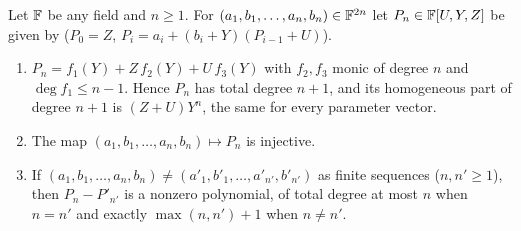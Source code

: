 \begin{lemma}\label{lem:ph:injective}
Let $\mathbb{F}$ be any field and $n\ge1$.  For $(a_1,b_1,\dots,a_n,b_n)\in\mathbb{F}^{2n}$ let
$P_n\in\mathbb{F}[U,Y,Z]$ be given by 
($P_0=Z$, $P_i=a_i+(b_i+Y)(P_{i-1}+U)$).
\begin{enumerate}[label=(\roman*)]
\item $P_n=f_1(Y)+Z\,f_2(Y)+U\,f_3(Y)$ with $f_2,f_3$ monic of degree $n$ and
      $\deg f_1\le n-1$.  Hence $P_n$ has total degree $n+1$, and its
      homogeneous part of degree $n+1$ is $(Z+U)Y^n$, the same for every
      parameter vector.
\item The map $(a_1,b_1,\dots,a_n,b_n)\mapsto P_n$ is injective.
\item If $(a_1,b_1,\dots,a_n,b_n)\ne(a'_1,b'_1,\dots,a'_{n'},b'_{n'})$ as
      finite sequences ($n,n'\ge1$), then $P_n-P'_{n'}$ is a nonzero
      polynomial, of total degree at most $n$ when $n=n'$ and exactly
      $\max(n,n')+1$ when $n\ne n'$.
\end{enumerate}
\end{lemma}
